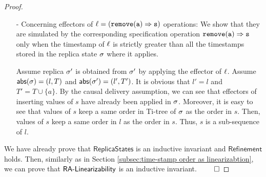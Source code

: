 \begin {proof}
\begin{itemize}
\item[-] Concerning effectors of $\alabel = (\alabellong[{\tt remove}]{a}{s}{})$ operations: We show that they are simulated by the corresponding specification operation $\alabellong[{\tt remove}]{a}{s}{}$ only when the timestamp of $\ell$ is strictly greater than all the timestamps stored in the replica state $\sigma$ where it applies. 

    Assume replica $\sigma'$ is obtained from $\sigma'$ by applying the effector of $\ell$. Assume $\mathsf{abs}(\sigma) = (l,T)$ and $\mathsf{abs}(\sigma') = (l',T')$. It is obvious that $l' = l$ and $T' = T \cup \{ a \}$. By the causal delivery assumption, we can see that effectors of inserting values of $s$ have already been applied in $\sigma$. Moreover, it is easy to see that values of $s$ keep a same order in Ti-tree of $\sigma$ as the order in $s$. Then, values of $s$ keep a same order in $l$ as the order in $s$. Thus, $s$ is a sub-sequence of $l$.
\end{itemize}

We have already prove that $\mathsf{ReplicaStates}$ is an inductive invariant and $\mathsf{Refinement}$ holds. Then, similarly as in Section \ref{subsec:time-stamp order as linearizabtion}, we can prove that $\mathsf{RA\text{-}Linearizability{}}$ is an inductive invariant. $\qed$ 
\end {proof}

















